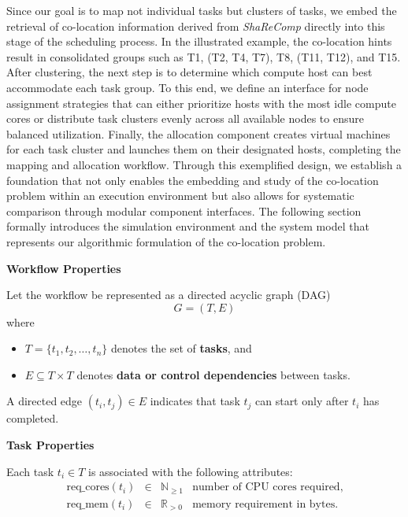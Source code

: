 Since our goal is to map not individual tasks but clusters of tasks, we embed the retrieval of co-location information derived from \textit{ShaReComp} directly into this stage of the scheduling process. In the illustrated example, the co-location hints result in consolidated groups such as T1, (T2, T4, T7), T8, (T11, T12), and T15. After clustering, the next step is to determine which compute host can best accommodate each task group. To this end, we define an interface for node assignment strategies that can either prioritize hosts with the most idle compute cores or distribute task clusters evenly across all available nodes to ensure balanced utilization. Finally, the allocation component creates virtual machines for each task cluster and launches them on their designated hosts, completing the mapping and allocation workflow. Through this exemplified design, we establish a foundation that not only enables the embedding and study of the co-location problem within an execution environment but also allows for systematic comparison through modular component interfaces. The following section formally introduces the simulation environment and the system model that represents our algorithmic formulation of the co-location problem.


\textbf{Workflow Properties}

Let the workflow be represented as a directed acyclic graph (DAG)
\[
    G = (T, E)
\]
where
\begin{itemize}
    \item $T = \{t_1, t_2, \dots, t_n\}$ denotes the set of \textbf{tasks}, and
    \item $E \subseteq T \times T$ denotes \textbf{data or control dependencies} between tasks.
\end{itemize}
A directed edge $(t_i, t_j) \in E$ indicates that task $t_j$ can start only after $t_i$ has completed.

\textbf{Task Properties}

Each task \( t_i \in T \) is associated with the following attributes:
\[
    \begin{array}{rcll}
        \text{req\_cores}(t_i) & \in & \mathbb{N}_{\ge 1} & \text{number of CPU cores required}, \\[4pt]
        \text{req\_mem}(t_i)   & \in & \mathbb{R}_{>0}    & \text{memory requirement in bytes.}
    \end{array}
\]

